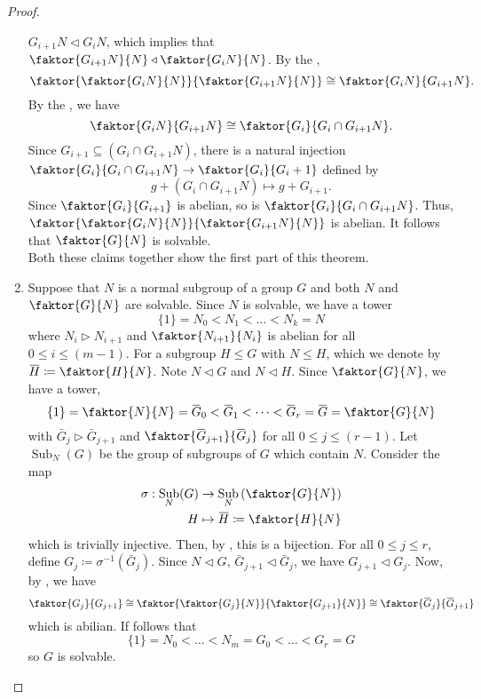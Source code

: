 \documentclass[11pt]{article}
\newcommand{\quotient}[2]{\faktor{#1}{#2}}
\DeclareMathOperator{\Sub}{Sub}
\begin{document}
\begin{proof}
\begin{enumerate}
$G_{i+1}N \triangleleft G_iN$, which implies that $\quotient{G_{i+1}N}{N}
\triangleleft \quotient{G_iN}{N}$. By the ,
\begin{equation*}
\quotient{\quotient{G_iN}{N}}{\quotient{G_{i+1}N}{N}} \cong
\quotient{G_iN}{G_{i+1}N}.
\end{equation*}
By the , we have
\begin{equation*}
\quotient{G_iN}{G_{i+1}N} \cong \quotient{G_i}{G_i\cap G_{i+1}N}.
\end{equation*}
Since $G_{i+1} \subseteq (G_i \cap G_{i+1}N)$, there is a natural injection
$\quotient{G_i}{G_i\cap G_{i+1}N} \to \quotient{G_i}{G_i+1}$ defined by
\begin{equation*}
g + (G_i\cap G_{i+1}N) \mapsto g + G_{i+1}.
\end{equation*}
Since $\quotient{G_i}{G_{i+1}}$ is abelian, so is $\quotient{G_i}{G_i \cap
G_{i+1}N}$. Thus, $\quotient{\quotient{G_iN}{N}}{\quotient{G_{i+1}N}{N}}$ is
abelian. It follows that $\quotient{G}{N}$ is solvable.\\

Both these claims together show the first part of this theorem.
\item Suppose that $N$ is a normal subgroup of a group $G$ and both $N$ and
$\quotient{G}{N}$ are solvable.
Since $N$ is solvable, we have a tower
\begin{equation*}
\{1\} = N_0 < N_1 < \dots < N_k = N
\end{equation*}
where $N_i \triangleright N_{i+1}$ and $\quotient{N_{i+1}}{N_{i}}$ is abelian
for all $0 \leq i \leq (m-1)$. For a subgroup $H \leq G$ with $N \leq H$, which
we denote by $\bar H \coloneq \quotient{H}{N}$. Note $N \triangleleft G$ and
$N \triangleleft H$. Since $\quotient{G}{N}$, we have a tower,
\begin{equation*}
\{1\} = \quotient{N}{N} = \bar G_0 < \bar G_1 < \dots < \bar G_r = \bar G =
\quotient{G}{N}
\end{equation*}
with $\bar G_j \triangleright \bar G_{j+1}$ and $\quotient{\bar G_{j+1}}{\bar
G_j}$ for all $0 \leq j \leq (r-1)$. Let $\Sub_N(G)$ be the group of subgroups
of $G$ which contain $N$. Consider the map
\begin{align*}
\sigma : \Sub_N(G) &\to \Sub_N\left(\quotient{G}{N}\right)\\
H &\mapsto \bar H \coloneqq \quotient{H}{N}
\end{align*}
which is trivially injective. Then, by , this is a bijection. For
all $0 \leq j \leq r$, define $G_j \coloneqq \sigma^{-1}(\bar G_j)$. Since
$N \triangleleft G$, $\bar G_{j+1} \triangleleft \bar G_j$, we have
$G_{j+1} \triangleleft G_j$. Now, by , we have
\begin{equation*}
\quotient{G_j}{G_{j+1}} \cong
\quotient{\quotient{G_j}{N}}{\quotient{G_{j+1}}{N}} \cong \quotient{\bar
G_j}{\bar G_{j+1}}
\end{equation*}
which is abilian. If follows that
\begin{equation*}
\{1\} = N_0 < \dots < N_m = G_0 < \dots < G_r = G
\end{equation*}
so $G$ is solvable.
\end{enumerate}
\end{proof}
\end{document}
